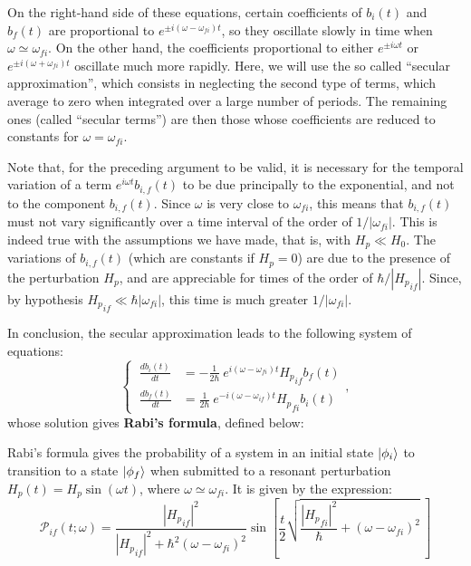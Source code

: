 On the right-hand side of these equations, certain coefficients of $b_i(t)$ and $b_f(t)$ are proportional to $e^{\pm i(\omega-\omega_{fi})t}$, so they oscillate slowly in time when $\omega\simeq \omega_{fi}$. On the other hand, the coefficients proportional to either $e^{\pm i\omega t}$ or $e^{\pm i(\omega+\omega_{fi})t}$ oscillate much more rapidly. Here, we will use the so called ``secular approximation'', which consists in neglecting the second type of terms, which average to zero when integrated over a large number of periods. The remaining ones (called ``secular terms'') are then those whose coefficients are reduced to constants for $\omega = \omega_{fi}$.

Note that, for the preceding argument to be valid, it is necessary for the temporal variation of a term $e^{i\omega t}b_{i,f}(t)$ to be due principally to the exponential, and not to the component $b_{i,f}(t)$. Since $\omega$ is very close to $\omega_{fi}$, this means that $b_{i,f}(t)$ must not vary significantly over a time interval of the order of $1/|\omega_{fi}|$. This is indeed true with the assumptions we have made, that is, with $H_p \ll H_0$. The variations of $b_{i,f}(t)$ (which are constants if $H_p= 0$) are due to the presence of the perturbation $H_p$, and are appreciable for times of the order of $\hbar / |{H_p}_{if}|$. Since, by hypothesis ${H_p}_{if}\ll\hbar |\omega_{fi}|$, this time is much greater $1/|\omega_{fi}|$.

In conclusion, the secular approximation leads to the following system of equations:
\begin{equation}
    \left\{\ 
    \begin{aligned}
        \frac{db_i(t)}{dt} &= -\frac{1}{2\hbar}\ e^{i(\omega - \omega_{fi}) t}{H_p}_{if}b_f (t)\\
        \frac{db_f(t)}{dt} &= \frac{1}{2\hbar}\ e^{-i(\omega - \omega_{if}) t}{H_p}_{fi}b_i (t) 
    \end{aligned}\right.,
\end{equation}
whose solution gives \textbf{Rabi's formula}, defined below:
\begin{definition}
    Rabi's formula gives the probability of a system in an initial state $\ket{\phi_i}$ to transition to a state $\ket{\phi_f}$ when submitted to a resonant perturbation $H_p(t) = H_p \sin(\omega t)$, where $\omega \simeq \omega_{fi}$. It is given by the expression:
    \begin{equation}
        \mathcal{P}_{if}(t;\omega) = \frac{|{H_p}_{if}|^2}{|{H_p}_{if}|^2 + \hbar^2(\omega-\omega_{fi})^2} \sin \left[\frac{t}{2}\sqrt{\frac{|{H_p}_{fi}|^2}{\hbar} + (\omega-\omega_{fi})^2}\ \right]
    \end{equation}
\end{definition}

